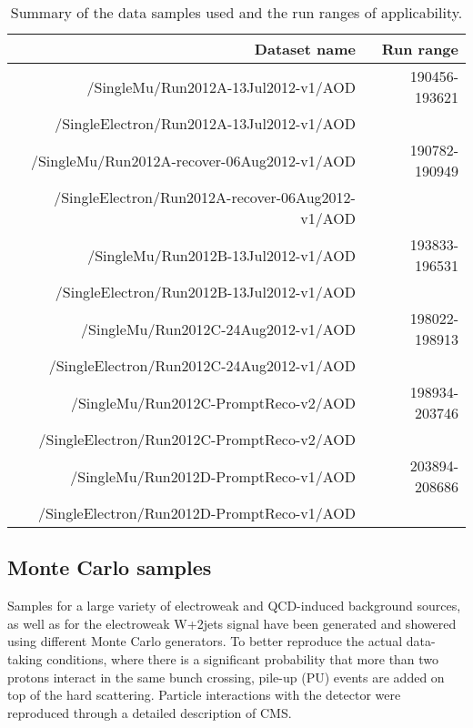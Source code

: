\begin{table}[htbp!]
  \begin{center}
  \begin{tabular}{r|r}
  \hline  \hline
  Dataset name & Run range \\
  \hline
  /SingleMu/Run2012A-13Jul2012-v1/AOD         & 190456-193621  \\
  /SingleElectron/Run2012A-13Jul2012-v1/AOD   &            \\
  \hline
  /SingleMu/Run2012A-recover-06Aug2012-v1/AOD        &  190782-190949  \\
  /SingleElectron/Run2012A-recover-06Aug2012-v1/AOD  &     \\
  \hline
  /SingleMu/Run2012B-13Jul2012-v1/AOD         &  193833-196531  \\
  /SingleElectron/Run2012B-13Jul2012-v1/AOD   &         \\
  \hline
  /SingleMu/Run2012C-24Aug2012-v1/AOD       & 198022-198913 \\
  /SingleElectron/Run2012C-24Aug2012-v1/AOD & \\
  \hline
  /SingleMu/Run2012C-PromptReco-v2/AOD       & 198934-203746 \\
  /SingleElectron/Run2012C-PromptReco-v2/AOD & \\
  \hline
  /SingleMu/Run2012D-PromptReco-v1/AOD       & 203894-208686 \\
  /SingleElectron/Run2012D-PromptReco-v1/AOD & \\
  \hline  \hline
  \end{tabular}
  \end{center}
  \caption{Summary of the data samples used and the run ranges of applicability.}
  \label{tab:datasets}
\end{table}%
\subsection{Monte Carlo samples}
Samples for a large variety of electroweak and QCD-induced background sources, 
as well as for the electroweak W+2jets signal 
have been generated and showered using different Monte Carlo generators.
To better reproduce the actual data-taking conditions, where there is a significant probability
that more than two protons interact in the same bunch crossing, pile-up (PU) events are
added on top of the hard scattering. Particle interactions with the detector were reproduced through
a detailed description of CMS.


